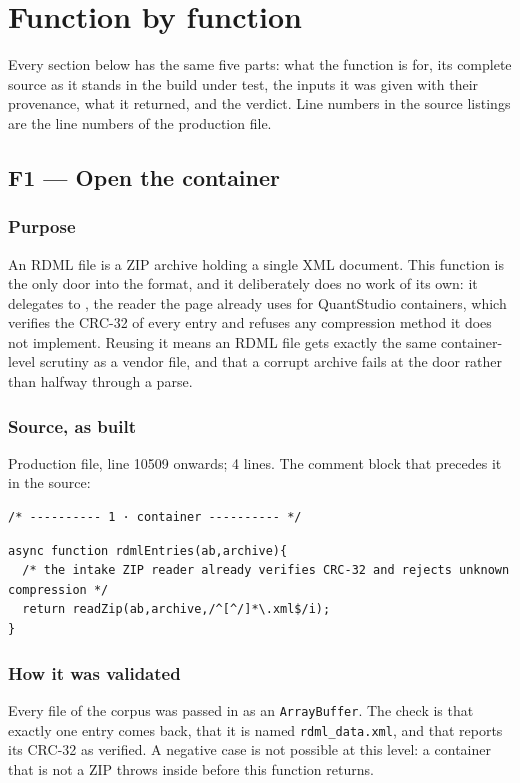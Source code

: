 \chapter{Function by function}\label{ch:functions}

Every section below has the same five parts: what the function is for, its complete source as it
stands in the build under test, the inputs it was given with their provenance, what it returned,
and the verdict. Line numbers in the source listings are the line numbers of the production file.

\clearpage
\section{F1\quad{} --- Open the container}
\label{sec:rdmlEntries}
\subsection*{Purpose}
An RDML file is a ZIP archive holding a single XML document. This function is the only
door into the format, and it deliberately does no work of its own: it delegates to ,
the reader the page already uses for QuantStudio containers, which verifies the CRC-32 of every
entry and refuses any compression method it does not implement. Reusing it means an RDML file gets
exactly the same container-level scrutiny as a vendor file, and that a corrupt archive fails at the
door rather than halfway through a parse.
\subsection*{Source, as built}
Production file, line 10509 onwards; 4 lines.
The comment block that precedes it in the source:
\begin{lstlisting}[style=jstiny]
/* ---------- 1 · container ---------- */
\end{lstlisting}

\begin{lstlisting}[style=js]
async function rdmlEntries(ab,archive){
  /* the intake ZIP reader already verifies CRC-32 and rejects unknown compression */
  return readZip(ab,archive,/^[^/]*\.xml$/i);
}
\end{lstlisting}

\subsection*{How it was validated}
Every file of the corpus was passed in as an \texttt{ArrayBuffer}. The check is that
exactly one entry comes back, that it is named \texttt{rdml\_data.xml}, and that 
reports its CRC-32 as verified. A negative case is not possible at this level: a container that is
not a ZIP throws inside  before this function returns.

